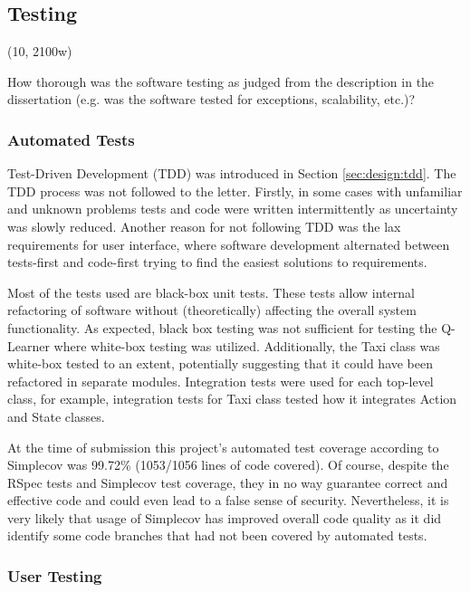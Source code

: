 \subsection{Testing}
\label{sec:implementation:testing}

(10, 2100w)

How thorough was the software testing as judged from the description in the
dissertation (e.g. was the software tested for exceptions, scalability, etc.)?


\subsubsection{Automated Tests}

Test-Driven Development (TDD) was introduced in Section \ref{sec:design:tdd}.
The TDD process was not followed to the letter. Firstly, in some cases with
unfamiliar and unknown problems tests and code were written intermittently as
uncertainty was slowly reduced. Another reason for not following TDD was the
lax requirements for user interface, where software development alternated
between tests-first and code-first trying to find the easiest solutions to
requirements.

Most of the tests used are black-box unit tests. These tests allow internal
refactoring of software without (theoretically) affecting the overall system
functionality. As expected, black box testing was not sufficient for testing
the Q-Learner where white-box testing was utilized. Additionally, the Taxi
class was white-box tested to an extent, potentially suggesting that it could
have been refactored in separate modules. Integration tests were used for each
top-level class, for example, integration tests for Taxi class tested how it
integrates Action and State classes.

At the time of submission this project's automated test coverage according to
Simplecov was 99.72\% (1053/1056 lines of code covered). Of course, despite the
RSpec tests and Simplecov test coverage, they in no way guarantee correct and
effective code and could even lead to a false sense of security. Nevertheless,
it is very likely that usage of Simplecov has improved overall code quality as
it did identify some code branches that had not been covered by automated
tests.


\subsubsection{User Testing}

